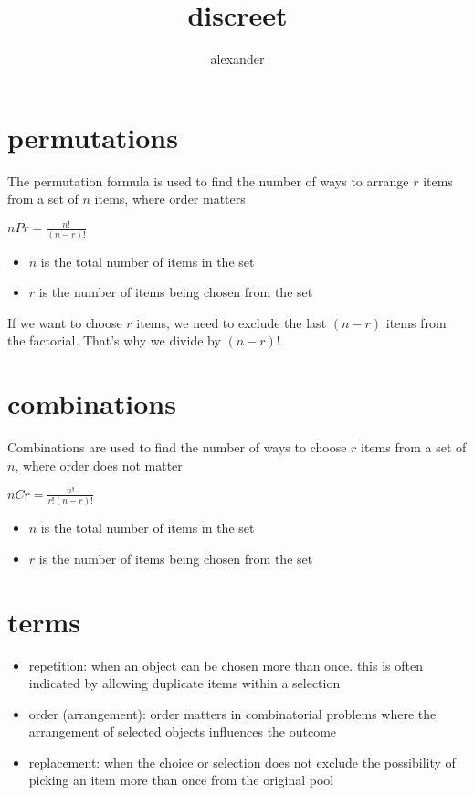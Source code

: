 \documentclass{article}
\title{discreet}
\author{alexander}
\begin{document}
\maketitle

\section{permutations}
The permutation formula is used to find the number of ways to arrange $r$ items from a set of $n$ items, where order matters 
\begin{center} $nPr = \frac{n!}{(n-r)!}$ \end{center}
	\begin{itemize}
		\item $n$ is the total number of items in the set
		\item $r$ is the number of items being chosen from the set
	\end{itemize}
If we want to choose $r$ items, we need to exclude the last $(n-r)$ items from the factorial. That's why we divide by $(n-r)!$

\section{combinations}
Combinations are used to find the number of ways to choose $r$ items from a set of $n$, where order does not matter
\begin{center} $nCr = \frac{n!}{r!(n-r)!}$ \end{center}
	\begin{itemize}
		\item $n$ is the total number of items in the set
		\item $r$ is the number of items being chosen from the set
	\end{itemize}

\section{terms}
	\begin{itemize}
		\item repetition: when an object can be chosen more than once. this is often indicated by allowing duplicate items within a selection
		\item order (arrangement): order matters in combinatorial problems where the arrangement of selected objects influences the outcome
		\item replacement: when the choice or selection does not exclude the possibility of picking an item more than once from the original pool
	\end{itemize}
\end{document}
